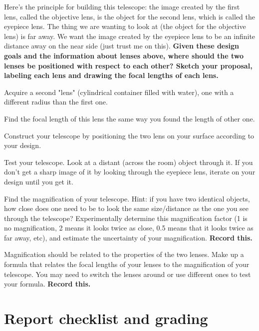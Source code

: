 \begin{steps}
	\item Here's the principle for building this telescope: the image created by the first lens, called the objective lens, is the object for the second lens, which is called the eyepiece lens. The thing we are wanting to look at (the object for the objective lens) is far away. We want the image created by the eyepiece lens to be an infinite distance away on the near side (just trust me on this). \textbf{Given these design goals and the information about lenses above, where should the two lenses be positioned with respect to each other? Sketch your proposal, labeling each lens and drawing the focal lengths of each lens.}
	
	\item Acquire a second "lens" (cylindrical container filled with water), one with a different radius than the first one.
	
	\item Find the focal length of this lens the same way you found the length of other one.
	
	\item Construct your telescope by positioning the two lens on your surface according to your design.
	
	\item Test your telescope. Look at a distant (across the room) object through it. If you don't get a sharp image of it by looking through the eyepiece lens, iterate on your design until you get it.
	
	\item Find the magnification of your telescope. Hint: if you have two identical objects, how close does one need to be to look the same size/distance as the one you see through the telescope? Experimentally determine this magnification factor (1 is no magnification, 2 means it looks twice as close, 0.5 means that it looks twice as far away, etc), and estimate the uncertainty of your magnification. \textbf{Record this.}
	
	\item Magnification should be related to the properties of the two lenses. Make up a formula that relates the focal lengths of your lenses to the magnification of your telescope. You may need to switch the lenses around or use different ones to test your formula. \textbf{Record this.}
\end{steps}

\section{Report checklist and grading}

